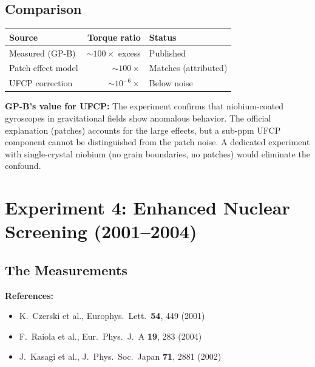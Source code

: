 \documentclass[11pt, a4paper]{article}
\begin{document}
\subsection{Comparison}

\begin{center}
\begin{tabular}{@{}lrl@{}}
\toprule
\textbf{Source} & \textbf{Torque ratio} & \textbf{Status} \\
\midrule
Measured (GP-B) & $\sim 100\times$ excess & Published \\
Patch effect model & $\sim 100\times$ & Matches (attributed) \\
UFCP correction & $\sim 10^{-6}\times$ & Below noise \\
\bottomrule
\end{tabular}
\end{center}

\begin{center}
\end{center}

\textbf{GP-B's value for UFCP:} The experiment confirms that
niobium-coated gyroscopes in gravitational fields show anomalous
behavior. The official explanation (patches) accounts for the
large effects, but a sub-ppm UFCP component cannot be
distinguished from the patch noise. A dedicated experiment with
single-crystal niobium (no grain boundaries, no patches) would
eliminate the confound.

\section{Experiment 4: Enhanced Nuclear Screening (2001--2004)}

\subsection{The Measurements}

\textbf{References:}
\begin{itemize}[nosep]
  \item K.~Czerski et al., Europhys.\ Lett.\ \textbf{54}, 449 (2001)
  \item F.~Raiola et al., Eur.\ Phys.\ J.\ A \textbf{19}, 283 (2004)
  \item J.~Kasagi et al., J.\ Phys.\ Soc.\ Japan \textbf{71}, 2881 (2002)
\end{itemize}
\end{document}
